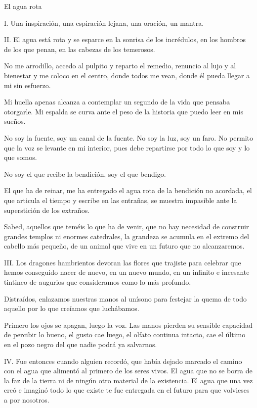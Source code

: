 El agua rota

I. Una inspiración, una espiración lejana,
una oración, un mantra.

II. El agua está rota y se esparce
en la sonrisa de los incrédulos,
en los hombros de los que penan,
en las cabezas de los temerosos.

No me arrodillo,
accedo al pulpito y reparto el remedio,
renuncio al lujo y al bienestar
y me coloco en el centro,
donde todos me vean,
donde él 
pueda llegar a mi sin esfuerzo.

Mi huella apenas alcanza a contemplar
un segundo de la vida que pensaba otorgarle.
Mi espalda se curva ante el peso de la historia
que puedo leer en mis sueños.

No soy la fuente,
soy un canal de la fuente.
No soy la luz,
soy un faro.
No permito que la voz se levante en mi interior,
pues debe repartirse por todo lo que soy y lo que somos.

No soy el que recibe la bendición,
soy el que bendigo.

El que ha de reinar,
me ha entregado el agua rota de la bendición no acordada,
el que articula el tiempo y escribe en las entrañas,
se muestra impasible ante la superstición de los extraños.

Sabed, aquellos que teméis lo que ha de venir,
que no hay necesidad de construir grandes templos
ni enormes catedrales,
la grandeza se acumula en el extremo del cabello más pequeño,
de un animal que vive en un futuro que no alcanzaremos.

III. Los dragones hambrientos
devoran las flores que trajiste
para celebrar que hemos conseguido nacer de nuevo,
en un nuevo mundo,
en un infinito e incesante tintineo de augurios
que consideramos como lo más profundo.

Distraídos, enlazamos nuestras manos al unísono
para festejar la quema de todo aquello
por lo que creíamos que luchábamos.

Primero los ojos se apagan,
luego la voz.
Las manos pierden 
su sensible capacidad de percibir lo bueno,
el gusto cae luego,
el olfato continua intacto,
cae el último en el pozo negro
del que nadie podrá ya salvarnos.

IV. Fue entonces cuando alguien recordó, 
que había dejado marcado el camino
con el agua que alimentó al primero de los seres vivos.
El agua que no se borra de la faz de la tierra
ni de ningún otro material de la existencia.
El agua que una vez creó 
e imaginó todo lo que existe
te fue entregada en el futuro
para que volvieses a por nosotros.

